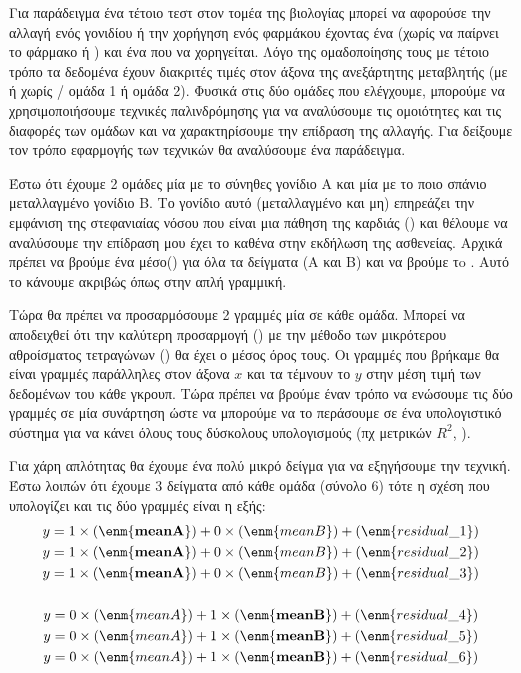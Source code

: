 Για παράδειγμα ένα τέτοιο τεστ στον τομέα της
βιολογίας μπορεί να αφορούσε την αλλαγή ενός γονιδίου ή την χορήγηση ενός φαρμάκου
έχοντας ένα  (χωρίς να παίρνει το φάρμακο ή ) και ένα που να
χορηγείται. Λόγο της ομαδοποίησης τους με τέτοιο τρόπο τα δεδομένα έχουν διακριτές τιμές
στον άξονα της ανεξάρτητης μεταβλητής (με ή χωρίς / ομάδα 1 ή ομάδα 2). Φυσικά στις δύο
ομάδες που ελέγχουμε, μπορούμε να χρησιμοποιήσουμε τεχνικές παλινδρόμησης για να
αναλύσουμε τις ομοιότητες και τις διαφορές των ομάδων και να χαρακτηρίσουμε την
επίδραση της αλλαγής. Για δείξουμε τον τρόπο εφαρμογής των τεχνικών θα αναλύσουμε ένα
παράδειγμα.

Έστω ότι έχουμε 2 ομάδες μία με το σύνηθες γονίδιο Α και μία με το ποιο σπάνιο
μεταλλαγμένο γονίδιο Β. Το γονίδιο αυτό (μεταλλαγμένο και μη) επηρεάζει την
εμφάνιση της στεφανιαίας νόσου που είναι μια πάθηση της καρδιάς () και θέλουμε
να αναλύσουμε την επίδραση μου έχει το καθένα στην εκδήλωση της ασθενείας. Αρχικά
πρέπει να βρούμε ένα μέσο() για όλα τα δείγματα (Α και Β) και να βρούμε τo .
Αυτό το κάνουμε ακριβώς όπως στην απλή γραμμική.

Τώρα θα πρέπει να προσαρμόσουμε 2
γραμμές μία σε κάθε ομάδα. Μπορεί να αποδειχθεί ότι την καλύτερη προσαρμογή ()
με την μέθοδο των μικρότερου αθροίσματος τετραγώνων () θα έχει ο μέσος
όρος τους. Οι γραμμές που βρήκαμε θα είναι γραμμές παράλληλες στον άξονα $x$ και τα
τέμνουν το $y$ στην μέση τιμή των δεδομένων του κάθε γκρουπ. Τώρα πρέπει να βρούμε έναν
τρόπο να ενώσουμε τις δύο γραμμές σε μία συνάρτηση ώστε να μπορούμε να το περάσουμε
σε ένα υπολογιστικό σύστημα για να κάνει όλους τους δύσκολους υπολογισμούς (πχ
μετρικών $R^2$, ).

Για χάρη απλότητας θα έχουμε ένα πολύ μικρό δείγμα για να
εξηγήσουμε την τεχνική.
Έστω λοιπών ότι έχουμε 3 δείγματα από κάθε ομάδα (σύνολο 6) τότε η σχέση που υπολογίζει
και τις δύο γραμμές είναι η εξής:
\begin{gather*}
    y=1\times (\enm{\textbf{meanA}}) + 0\times (\enm{meanB}) + (\enm{residual\_1})\\
    y=1\times (\enm{\textbf{meanA}}) + 0\times (\enm{meanB}) + (\enm{residual\_2})\\
    y=1\times (\enm{\textbf{meanA}}) + 0\times (\enm{meanB}) + (\enm{residual\_3})\\
    \\
    y=0\times (\enm{meanA}) + 1\times (\enm{\textbf{meanB}}) + (\enm{residual\_4})\\
    y=0\times (\enm{meanA}) + 1\times (\enm{\textbf{meanB}}) + (\enm{residual\_5})\\
    y=0\times (\enm{meanA}) + 1\times (\enm{\textbf{meanB}}) + (\enm{residual\_6})
\end{gather*}


